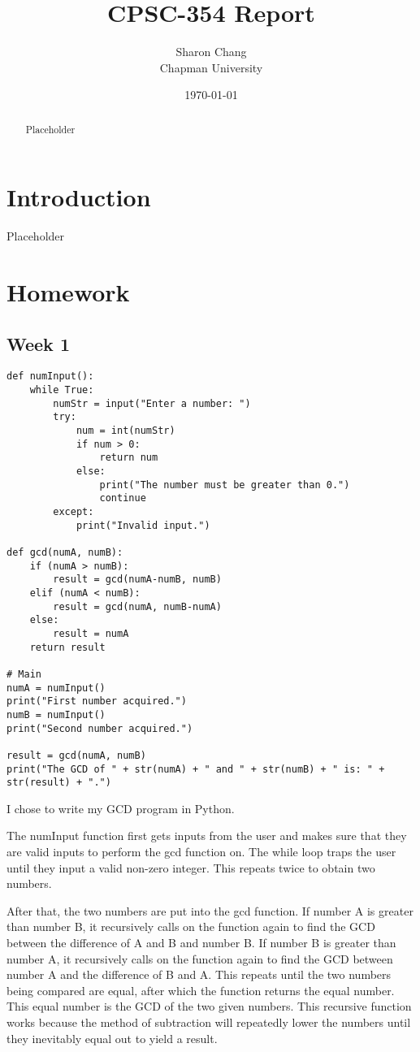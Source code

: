 \documentclass{article}
\title{CPSC-354 Report}
\author{Sharon Chang  \\ Chapman University}
\date{\today}
\theoremstyle{theorem}
\theoremstyle{definition}
\theoremstyle{remark}
\begin{document}
\maketitle

\begin{abstract}
Placeholder  
\end{abstract}

\tableofcontents

\section{Introduction}\label{intro}

Placeholder

\section{Homework}\label{homework}


\subsection{Week 1}

\begin{lstlisting}
def numInput():
    while True:
        numStr = input("Enter a number: ")
        try:
            num = int(numStr)
            if num > 0:
                return num
            else:
                print("The number must be greater than 0.")
                continue
        except:
            print("Invalid input.")

def gcd(numA, numB):
    if (numA > numB):
        result = gcd(numA-numB, numB)
    elif (numA < numB):
        result = gcd(numA, numB-numA)
    else:
        result = numA
    return result

# Main
numA = numInput()
print("First number acquired.")
numB = numInput()
print("Second number acquired.")

result = gcd(numA, numB)
print("The GCD of " + str(numA) + " and " + str(numB) + " is: " + str(result) + ".")
\end{lstlisting}
%
I chose to write my GCD program in Python.

\medskip\noindent
The numInput function first gets inputs from the user and makes sure that they are valid inputs to perform the gcd function on. The while loop traps the user until they input a valid non-zero integer. This repeats twice to obtain two numbers.

\medskip\noindent
After that, the two numbers are put into the gcd function. If number A is greater than number B, it recursively calls on the function again to find the GCD between the difference of A and B and number B. If number B is greater than number A, it recursively calls on the function again to find the GCD between number A and the difference of B and A. This repeats until the two numbers being compared are equal, after which the function returns the equal number. This equal number is the GCD of the two given numbers. This recursive function works because the method of subtraction will repeatedly lower the numbers until they inevitably equal out to yield a result.
\end{document}
